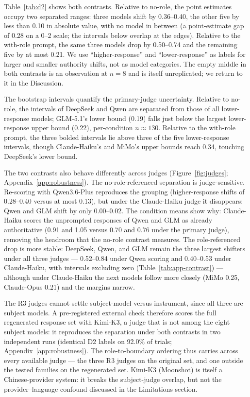 \documentclass[11pt]{article}
\begin{document}
Table~\ref{tab:d2} shows both contrasts. Relative to no-role, the point estimates occupy two separated ranges: three models shift by 0.36--0.40, the other five by less than 0.10 in absolute value, with no model in between (a point-estimate gap of 0.28 on a 0--2 scale; the intervals below overlap at the edges). Relative to the with-role prompt, the same three models drop by 0.50--0.74 and the remaining five by at most 0.21. We use ``higher-response'' and ``lower-response'' as labels for larger and smaller authority shifts, not as model categories. The empty middle in both contrasts is an observation at $n = 8$ and is itself unreplicated; we return to it in the Discussion.

The bootstrap intervals quantify the primary-judge uncertainty. Relative to no-role, the intervals of DeepSeek and Qwen are separated from those of all lower-response models; GLM-5.1's lower bound (0.19) falls just below the largest lower-response upper bound (0.22), per-condition $n \approx 130$. Relative to the with-role prompt, the three bolded intervals lie above three of the five lower-response intervals, though Claude-Haiku's and MiMo's upper bounds reach 0.34, touching DeepSeek's lower bound.

The two contrasts also behave differently across judges (Figure~\ref{fig:judges}; Appendix~\ref{app:robustness}). The no-role-referenced separation is judge-sensitive. Re-scoring with Qwen3.6-Plus reproduces the grouping (higher-response shifts of 0.28--0.40 versus at most 0.13), but under the Claude-Haiku judge it disappears: Qwen and GLM shift by only 0.00--0.02. The condition means show why: Claude-Haiku scores the unprompted responses of Qwen and GLM as already authoritative (0.91 and 1.05 versus 0.70 and 0.76 under the primary judge), removing the headroom that the no-role contrast measures. The role-referenced drop is more stable: DeepSeek, Qwen, and GLM remain the three largest shifters under all three judges --- 0.52--0.84 under Qwen scoring and 0.40--0.53 under Claude-Haiku, with intervals excluding zero (Table~\ref{tab:app-contrast}) --- although under Claude-Haiku the next models follow more closely (MiMo 0.25, Claude-Opus 0.21) and the margins narrow.

The R3 judges cannot settle subject-model versus instrument, since all three are subject models. A pre-registered external check therefore scores the full regenerated response set with Kimi-K3, a judge that is not among the eight subject models: it reproduces the separation under both contrasts in two independent runs (identical D2 labels on 92.0\% of trials; Appendix~\ref{app:robustness}). The role-to-boundary ordering thus carries across every available judge --- the three R3 judges on the original set, and one outside the tested families on the regenerated set. Kimi-K3 (Moonshot) is itself a Chinese-provider system: it breaks the subject-judge overlap, but not the provider--language confound discussed in the Limitations section.
\end{document}
